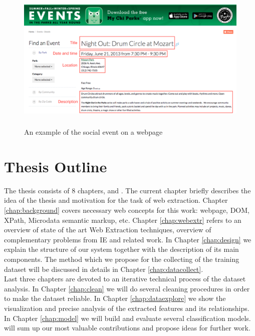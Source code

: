 \begin{figure}[h]
\begin{center}
\includegraphics[height=7cm]{figures01/event_example}
\caption{An example of the social event on a webpage}
\label{fig:webevent}
\end{center}
\end{figure}


\section{Thesis Outline}
The thesis consists of 8 chapters,  and . The current chapter briefly describes the idea of the thesis and motivation for the task of web extraction. Chapter \ref{chap:background} covers necessary web concepts for this work: webpage, DOM, XPath, Microdata semantic markup, etc. Chapter \ref{chap:webextr} refers to an overview of state of the art Web Extraction techniques, overview of complementary problems from IE and related work. In Chapter \ref{chap:design} we explain the structure of our system together with the description of its main components. The method which we propose for the collecting of the training dataset will be discussed in details in Chapter \ref{chap:datacollect}. \\

Last three chapters are devoted to an iterative technical process of the dataset analysis. In Chapter \ref{chap:clean} we will do several cleaning procedures in order to make the dataset reliable. In Chapter \ref{chap:dataexplore} we show the visualization and precise analysis of the extracted features and its relationships. In Chapter \ref{chap:model} we will build  and evaluate several classification models.  will sum up our most valuable contributions and propose ideas for further work.
